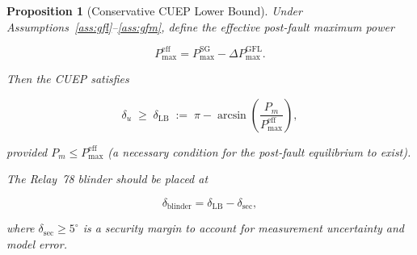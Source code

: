 \documentclass[11pt,a4paper]{article}
\newtheorem{proposition}{Proposition}
\newcommand{\du}{\delta_u}         %
\newcommand{\dlb}{\delta_{\mathrm{LB}}}   %
\newcommand{\Pm}{P_m}
\newcommand{\PmaxSG}{P_{\max}^{\mathrm{SG}}}
\newcommand{\PmaxEff}{P_{\max}^{\mathrm{eff}}}
\begin{document}
\begin{proposition}[Conservative CUEP Lower Bound]
\label{prop:cuep}
Under Assumptions~\ref{ass:gfl}--\ref{ass:gfm}, define the effective
post-fault maximum power

\begin{equation}
  \boxed{\PmaxEff = \PmaxSG - \Delta P_{\max}^{\mathrm{GFL}}.}
  \label{eq:Peff}
\end{equation}

Then the CUEP satisfies

\begin{equation}
  \boxed{\du \;\geq\; \dlb \;:=\; \pi - \arcsin\!\left(\frac{\Pm}{\PmaxEff}\right),}
  \label{eq:cuep_lb}
\end{equation}

provided $\Pm \leq \PmaxEff$ (a necessary condition for the post-fault
equilibrium to exist).

The Relay~78 blinder should be placed at

\begin{equation}
  \boxed{\delta_{\mathrm{blinder}} = \dlb - \delta_{\mathrm{sec}},}
  \label{eq:blinder}
\end{equation}

where $\delta_{\mathrm{sec}} \geq 5^{\circ}$ is a security margin to account
for measurement uncertainty and model error.
\end{proposition}
\end{document}
